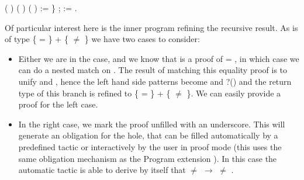 \begin{coqdoccode}
\coqdocindent{1.00em}
 ( ) ( ) ( ) :=  \coqdocvar{\_} \} ;\coqdoceol
\coqdocnoindent
{}   :=  \coqdocvar{\_}.\coqdoceol
\coqdocemptyline
\end{coqdoccode}
Of particular interest here is the inner program refining the recursive result.
   As    is of type \{  =  \} + \{  \ensuremath{\not=}  \} we have two cases to consider:



\begin{itemize}
\item  Either we are in the   case, and we know that  is a proof of  = ,
     in which case we can do a nested match on . The result of matching this equality
     proof is to unify  and , hence the left hand side patterns become   and
      ?() and the return type of this branch is refined to \{  =  \} + \{  \ensuremath{\not=}  \}.
     We can easily provide a proof for the left case. 



\item  In the right case, we mark the proof unfilled with an underscore. This will
     generate an obligation for the hole, that can be filled automatically by a 
     predefined tactic or interactively by the user in proof mode (this uses the
     same obligation mechanism as the Program extension
     \cite{sozeau.Coq/FingerTrees/article}). In this case the automatic tactic 
     is able to derive by itself that  \ensuremath{\not=}  \ensuremath{\rightarrow}   \ensuremath{\not=}  .

\end{itemize}


